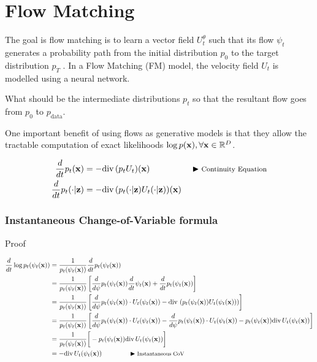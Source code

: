 \documentclass[a4paper, 11pt]{article}
\begin{document}
\section{Flow Matching}
The goal is flow matching is to learn a vector field $U_t^{\theta}$ such that its flow $\psi_t$ generates a probability path from the initial distribution $p_0$ to the target distribution $p_T$ \citep{lipman2024flow}. In a Flow Matching (FM) model, the velocity field $U_t$ is modelled using a neural network.

What should be the intermediate distributions $p_t$ so that the resultant flow goes from $p_0$ to $p_{\text{data}}$.

\begin{Takeaway}{}{}
    One important benefit of using flows as generative models is that they allow the tractable computation of exact likelihoods $\log p(\mbox{$\mbox{$\mathbf{x}$}$}), \forall \mbox{$\mbox{$\mathbf{x}$}$} \in \mathbb{R}^D$.
\end{Takeaway}


\begin{align}
    \frac{d}{dt} p_t(\mbox{$\mbox{$\mathbf{x}$}$}) &= - \text{div}\, (p_t U_t)(\mbox{$\mbox{$\mathbf{x}$}$}) && \blacktriangleright\text{\footnotesize Continuity Equation}\\
    \frac{d}{dt} p_t(\cdot | \mbox{$\mbox{$\mathbf{z}$}$}) &= - \text{div}\, (p_t(\cdot |\mbox{$\mbox{$\mathbf{z}$}$}) U_t(\cdot |\mbox{$\mbox{$\mathbf{z}$}$}))(\mbox{$\mbox{$\mathbf{x}$}$})
\end{align}
 

\subsubsection{Instantaneous Change-of-Variable formula}

Proof

\begin{align}
    \frac{d}{dt} \log p_t(\psi_t(\mbox{$\mbox{$\mathbf{x}$}$})) &=  \frac{1}{p_t(\psi_t(\mbox{$\mbox{$\mathbf{x}$}$}))}\frac{d}{dt}p_t(\psi_t(\mbox{$\mbox{$\mathbf{x}$}$})) \\
    &=  \frac{1}{p_t(\psi_t(\mbox{$\mbox{$\mathbf{x}$}$}))}\left [\frac{d}{d\psi}p_t(\psi_t(\mbox{$\mbox{$\mathbf{x}$}$})) \frac{d}{dt}\psi_t(\mbox{$\mbox{$\mathbf{x}$}$}) + \frac{d}{dt}p_t(\psi_t(\mbox{$\mbox{$\mathbf{x}$}$})) \right ]\\
    &= \frac{1}{p_t(\psi_t(\mbox{$\mbox{$\mathbf{x}$}$}))} \left [\frac{d}{d\psi}p_t(\psi_t(\mbox{$\mbox{$\mathbf{x}$}$})) \cdot U_t(\psi_t(\mbox{$\mbox{$\mathbf{x}$}$})) - \text{div}\, \left (p_t(\psi_t(\mbox{$\mbox{$\mathbf{x}$}$})) U_t(\psi_t(\mbox{$\mbox{$\mathbf{x}$}$})) \right ) \right ] \\
    &= \frac{1}{p_t(\psi_t(\mbox{$\mbox{$\mathbf{x}$}$}))} \left [\frac{d}{d\psi}p_t(\psi_t(\mbox{$\mbox{$\mathbf{x}$}$})) \cdot U_t(\psi_t(\mbox{$\mbox{$\mathbf{x}$}$})) - \frac{d}{d\psi}p_t(\psi_t(\mbox{$\mbox{$\mathbf{x}$}$})) \cdot U_t(\psi_t(\mbox{$\mbox{$\mathbf{x}$}$})) - p_t(\psi_t(\mbox{$\mbox{$\mathbf{x}$}$})) \text{div}\, U_t(\psi_t(\mbox{$\mbox{$\mathbf{x}$}$}))  \right ] \\
    &= \frac{1}{p_t(\psi_t(\mbox{$\mbox{$\mathbf{x}$}$}))} \bigg [- p_t(\psi_t(\mbox{$\mbox{$\mathbf{x}$}$})) \text{div}\, U_t(\psi_t(\mbox{$\mbox{$\mathbf{x}$}$}))  \bigg ] \\
    &= - \text{div}\, U_t(\psi_t(\mbox{$\mbox{$\mathbf{x}$}$})) \qquad \qquad \blacktriangleright\text{\footnotesize Instantaneous CoV}
\end{align}
\end{document}
